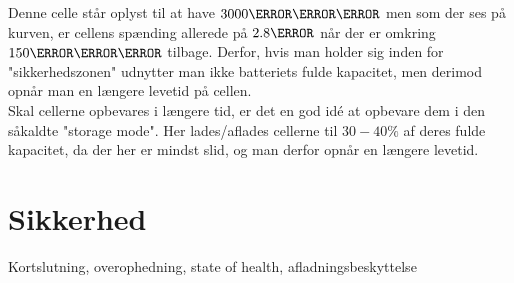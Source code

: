 Denne celle står oplyst til at have $3000\milli\ampere\hour$ men som der ses på kurven, er cellens spænding allerede på $2.8\volt$ når der er omkring $150\milli\ampere\hour$ tilbage. Derfor, hvis man holder sig inden for "sikkerhedszonen" \space udnytter man ikke batteriets fulde kapacitet, men derimod opnår man en længere levetid på cellen. \\

Skal cellerne opbevares i længere tid, er det en god idé at opbevare dem i den såkaldte "storage mode". Her lades/aflades cellerne til $30-40\percent$ af deres fulde kapacitet, da der her er mindst slid, og man derfor opnår en længere levetid. 

\section{Sikkerhed}

Kortslutning, overophedning, state of health, afladningsbeskyttelse
